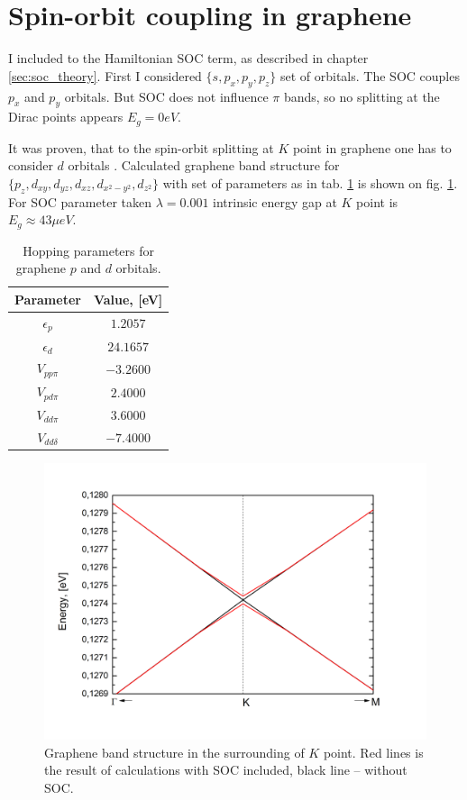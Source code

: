 \newpage
\section{Spin-orbit coupling in graphene}
I included to the Hamiltonian SOC term, as described in chapter \ref{sec:soc_theory}. First I considered $\{ s, p_x, p_y, p_z \}$ set of orbitals. The SOC couples $p_x$ and $p_y$ orbitals. But SOC does not influence $\pi$ bands, so no splitting at the Dirac points appears $E_g = 0 eV$.

It was proven, that to the spin-orbit splitting at $K$ point in graphene one has to consider $d$
orbitals \cite{slonczewski}. Calculated graphene band structure for $\{p_z, d_{xy}, d_{yz}, d_{xz}, d_{x^2 - y^2}, d_{z^2} \}$ with set of parameters as in tab. \ref{tab:graphene_soc} is shown on fig. \ref{fig:graphene_soc}. For SOC parameter taken $\lambda=0.001$ intrinsic energy gap at $K$ point is $E_g \approx 43 \mu eV$.
\begin{table}[h!]
 \begin{center}
  \begin{tabular}{|c|c|}
  \hline
    Parameter&Value, [eV]\\ \hline
    $\epsilon_p$ & $1.2057$ \\ \hline
    $\epsilon_d$ & $24.1657$ \\ \hline
    $V_{pp \pi}$ & $-3.2600$  \\ \hline
    $V_{pd \pi}$ & $2.4000$\\ \hline
    $V_{dd \pi}$ & $3.6000$ \\ \hline
    $V_{dd \delta}$ &  $-7.4000$\\ \hline
  \end{tabular}
 \end{center}
  \caption{Hopping parameters for graphene $p$ and $d$ orbitals. \cite{graphene_soc_parameters}}
  \label{tab:graphene_soc}
\end{table}

\begin{figure}[h!] 
\begin{center}
  \includegraphics[width=0.6\linewidth]{img/graphene_gap}
  \caption{Graphene band structure in the surrounding of $K$ point. Red lines is the result of calculations with SOC included, black line -- without SOC. \label{fig:graphene_soc}}
\end{center}
\end{figure}
